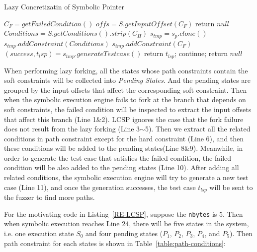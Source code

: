 \begin{algorithm}
  \caption{Lazy Concretizatin of Symbolic Pointer}
  \label{LCSP}
  $C_F = getFailedCondition()$\;
  $offs = S.getInputOffset(C_F)$\;
  {
    return $null$\;
  }
  $Conditions = S.getConditions().strip(C_H)$\;
  {
    $s_{tmp} = s_p.clone()$\;
    $s_{tmp}.addConstraint(Conditions)$\;
    $s_{tmp}.addConstraint(C_F)$\;
    $(success, t_lsp) = s_{tmp}.generateTestcase()$\;
    {
      return $t_{lsp}$;
    } {
      continue;
    }
  }
  return $null$\;
\end{algorithm}
  
When performing lazy forking, all the states whose path constraints contain the soft constraints will be collected into \emph{Pending States}. And the pending states are grouped by the input offsets that affect the corresponding soft constraint. 
Then when the symbolic execution engine fails to fork at the branch that depends on soft constraints, the failed condition will be inspected to extract the input offsets that affect this branch (Line 1\&2). LCSP ignores the case that the fork failure does not result from the lazy forking (Line 3$\sim$5). Then we extract all the related conditions in path constraint except for the hard constraint (Line 6), and then these conditions will be added to the pending states(Line 8\&9). Meanwhile, in order to generate the test case that satisfies the failed condition, the failed condition will be also added to the pending states (Line 10). After adding all related conditions, the symbolic execution engine will try to generate a new test case (Line 11), and once the generation successes, the test case $t_{lsp}$ will be sent to the fuzzer to find more paths.

For the motivating code in Listing~\ref{RE-LCSP}, suppose the \texttt{nbytes} is 5. Then when symbolic execution reaches Line 24, there will be five states in the system, i.e. one execution state $S_0$ and four pending states ($P_1$, $P_2$, $P_3$, $P_4$, and $P_5$). 
Then path constraint for each states is shown in Table~\ref{table:path-conditions}:

